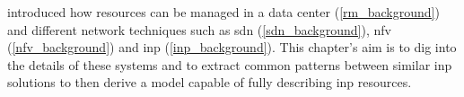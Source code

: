  introduced how resources can be managed in a data center (\autoref{rm_background}) and different network techniques such as \gls{sdn} (\autoref{sdn_background}), \gls{nfv} (\autoref{nfv_background}) and \gls{inp} (\autoref{inp_background}).
This chapter's aim is to dig into the details of these systems and to extract common patterns between similar \gls{inp} solutions to then derive a model capable of fully describing \gls{inp} resources.
